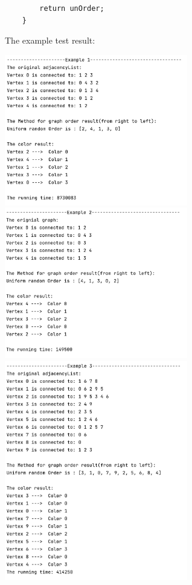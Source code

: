 \documentclass{article}
\begin{document}
\begin{enumerate}
\begin{verbatim}
        return unOrder;
    }
    \end{verbatim}
        The example test result:
            \begin{center}
        \includegraphics[width=0.6\textwidth]{p15.png}
        \includegraphics[width=0.6\textwidth]{p16.png}
        \includegraphics[width=0.6\textwidth]{p17.png}
    \end{center}



\end{enumerate}
\end{document}
